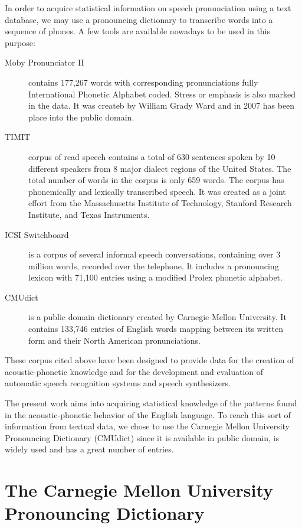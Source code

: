 In order to acquire statistical information on speech pronunciation using
a text database, we may use a pronouncing dictionary to transcribe words
into a sequence of phones. A few tools are available nowadays to be used
in this purpose:
\begin{description}
\item[Moby Pronunciator II] contains 177,267 words with corresponding pronunciations
fully International Phonetic Alphabet coded. Stress or emphasis is also marked in the data.
It was createb by William Grady Ward and in 2007 has been place into the public domain.
\item[TIMIT] corpus of read speech contains a total of 630 sentences spoken by
10 different speakers from 8 major dialect regions of the United States. The total
number of words in the corpus is only 659 words. The corpus has phonemically and lexically 
transcribed speech. It was created as a joint effort from  the Massachusetts
Institute of Technology, Stanford Research Institute, and Texas Instruments.
\item[ICSI Switchboard] is a corpus of several informal speech conversations, containing over
3 million words, recorded over the telephone. It includes a pronouncing lexicon with 71,100
entries using a modified Prolex phonetic alphabet.
\item[CMUdict] is a public domain dictionary created by Carnegie Mellon University. 
It contains 133,746 entries of English words mapping between its written form and their 
North American pronunciations.
\end{description}
These corpus cited above have been designed to provide data for
the creation of acoustic-phonetic knowledge and for the development and
evaluation of automatic speech recognition systems and speech synthesizers.

The present work aims into acquiring statistical knowledge of the patterns found in
the acoustic-phonetic behavior of the English language. To reach this sort of information
from textual data, we chose to use the Carnegie Mellon University Pronouncing Dictionary
(CMUdict) since it is available in public domain, is widely used and has a great number of
entries.

\section[CMUdict]{The Carnegie Mellon University Pronouncing Dictionary}

